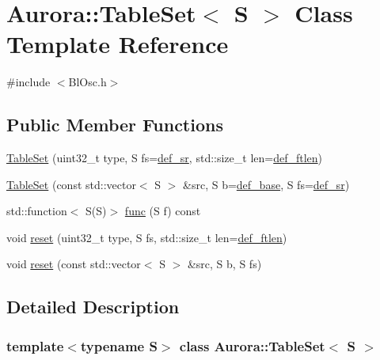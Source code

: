 \hypertarget{class_aurora_1_1_table_set}{}\section{Aurora\+:\+:Table\+Set$<$ S $>$ Class Template Reference}
\label{class_aurora_1_1_table_set}


{\ttfamily \#include $<$Bl\+Osc.\+h$>$}

\subsection*{Public Member Functions}
\begin{DoxyCompactItemize}
\item 
\hyperlink{class_aurora_1_1_table_set_a0be4528b972606335d73ac312da6337b}{Table\+Set} (uint32\+\_\+t type, S fs=\hyperlink{namespace_aurora_ad49263d809bea98dd422e95bc91bc03e}{def\+\_\+sr}, std\+::size\+\_\+t len=\hyperlink{namespace_aurora_a14dabfd9feedfa09c0e6f86d2627f006}{def\+\_\+ftlen})
\item 
\hyperlink{class_aurora_1_1_table_set_a884ecfde480fdac4c32fa10a82286941}{Table\+Set} (const std\+::vector$<$ S $>$ \&src, S b=\hyperlink{namespace_aurora_acb267dff62f74484893c2d5b679b78bf}{def\+\_\+base}, S fs=\hyperlink{namespace_aurora_ad49263d809bea98dd422e95bc91bc03e}{def\+\_\+sr})
\item 
std\+::function$<$ S(S)$>$ \hyperlink{class_aurora_1_1_table_set_a27a325a2c3c4b8cd50e0c86d6ac3c617}{func} (S f) const
\item 
void \hyperlink{class_aurora_1_1_table_set_ac2c945c49d53f60fd909dc771a6ff7e5}{reset} (uint32\+\_\+t type, S fs, std\+::size\+\_\+t len=\hyperlink{namespace_aurora_a14dabfd9feedfa09c0e6f86d2627f006}{def\+\_\+ftlen})
\item 
void \hyperlink{class_aurora_1_1_table_set_afec852dca45285ec57b6a4a97dffac36}{reset} (const std\+::vector$<$ S $>$ \&src, S b, S fs)
\end{DoxyCompactItemize}


\subsection{Detailed Description}
\subsubsection*{template$<$typename S$>$\newline
class Aurora\+::\+Table\+Set$<$ S $>$}

